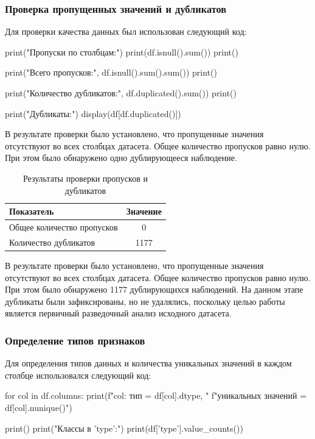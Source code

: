 \subsubsection*{Проверка пропущенных значений и дубликатов}
 
Для проверки качества данных был использован следующий код:
 
\begin{Code}
print("Пропуски по столбцам:")
print(df.isnull().sum())
print()

print("Всего пропусков:", df.isnull().sum().sum())
print()

print("Количество дубликатов:", df.duplicated().sum())
print()

print("Дубликаты:")
display(df[df.duplicated()])
\end{Code}
 
В результате проверки было установлено, что пропущенные значения
отсутствуют во всех столбцах датасета. Общее количество пропусков
равно нулю. При этом было обнаружено одно дублирующееся наблюдение.
 
\begin{table}[ht]
    \centering
    \caption{Результаты проверки пропусков и дубликатов}
    \label{tab:missing-duplicates-wine}
    \begin{tabularx}{0.65\textwidth}{LC}
        \hline
        Показатель & Значение \\
        \hline
        Общее количество пропусков & 0 \\
        Количество дубликатов & 1177 \\
        \hline
    \end{tabularx}
\end{table}

В результате проверки было установлено, что пропущенные значения отсутствуют во всех столбцах датасета. Общее количество пропусков равно нулю. При этом было обнаружено 1177 дублирующихся наблюдений. На данном этапе
дубликаты были зафиксированы, но не удалялись, поскольку целью работы
является первичный разведочный анализ исходного датасета.
 
\subsubsection*{Определение типов признаков}
 
Для определения типов данных и количества уникальных значений в каждом
столбце использовался следующий код:
 
\begin{Code}
for col in df.columns:
	print(f"{col}: тип = {df[col].dtype}, "
		f"уникальных значений = {df[col].nunique()}")

print()
print("Классы в 'type':")
print(df['type'].value_counts())
\end{Code}
 
